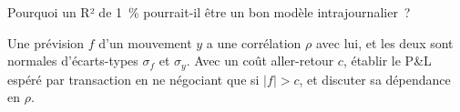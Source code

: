\begin{interviewq}\label{iq:s1:intraday-machine-learned-alphas:5}
Pourquoi un R² de 1~\% pourrait-il être un bon modèle intrajournalier~?
\end{interviewq}

\begin{interviewq}\label{iq:s1:intraday-machine-learned-alphas:6}
Une prévision $f$ d'un mouvement $y$ a une corrélation $\rho$ avec lui, et les deux sont normales d'écarts-types $\sigma_f$ et $\sigma_y$. Avec un coût aller-retour
$c$, établir le P\&L espéré par transaction en ne négociant que si $|f| > c$, et discuter sa dépendance en $\rho$.
\end{interviewq}
